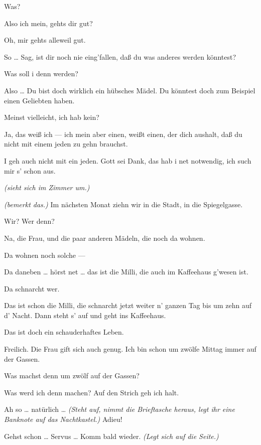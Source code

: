 \documentclass[
	final,
	a4paper,
	ngerman,
	mpinclude = true, %
	twoside = true,
	open = right,
	cleardoublepage = plain,
	DIV = 13,
	BCOR = 1cm,
	titlepage = firstiscover,
	]{scrbook}
\newcommand{\direction}[1]{\textit{(#1)}}
\newcommand{\thecharacter}[1]{\textup{\textsc{#1}}\xspace}
\newcommand{\thenutte}{\thecharacter{Leocadia}}
\newcommand{\theentrepeneurin}{\thecharacter{Katerina Albrecht}}
\newcommand{\character}[1]{\item[#1:]}
\newcommand{\nutte}{\character{\thenutte}}
\newcommand{\entrepeneurin}{\character{\theentrepeneurin}}
\begin{document}
\begin{play}
	\nutte
	Was?

	\entrepeneurin
	Also ich mein, gehts dir gut?

	\nutte
	Oh, mir gehts alleweil gut.

	\entrepeneurin
	So \ldots{} Sag, ist dir noch nie eing'fallen, daß du was anderes werden könntest?

	\nutte
	Was soll i denn werden?

	\entrepeneurin
	Also \ldots{} Du bist doch wirklich ein hübsches Mädel. Du könntest doch zum Beispiel einen Geliebten haben.

	\nutte
	Meinst vielleicht, ich hab kein?

	\entrepeneurin
	Ja, das weiß ich --- ich mein aber einen, weißt einen, der dich aushalt, daß du nicht mit einem jeden zu gehn brauchst.

	\nutte
	I geh auch nicht mit ein jeden. Gott sei Dank, das hab i net notwendig, ich such mir s' schon aus.

	\entrepeneurin
	\direction{sieht sich im Zimmer um.}

	\nutte
	\direction{bemerkt das.} Im nächsten Monat ziehn wir in die Stadt, in die Spiegelgasse.

	\entrepeneurin
	Wir? Wer denn?

	\nutte
	Na, die Frau, und die paar anderen Mädeln, die noch da wohnen.

	\entrepeneurin
	Da wohnen noch solche ---

	\nutte
	Da daneben \ldots{} hörst net \ldots{} das ist die Milli, die auch im Kaffeehaus g'wesen ist.

	\entrepeneurin
	Da schnarcht wer.

	\nutte
	Das ist schon die Milli, die schnarcht jetzt weiter n' ganzen Tag bis um zehn auf d' Nacht. Dann steht s' auf und geht ins Kaffeehaus.

	\entrepeneurin
	Das ist doch ein schauderhaftes Leben.

	\nutte
	Freilich. Die Frau gift sich auch genug. Ich bin schon um zwölfe Mittag immer auf der Gassen.

	\entrepeneurin
	Was machst denn um zwölf auf der Gassen?

	\nutte
	Was werd ich denn machen? Auf den Strich geh ich halt.

	\entrepeneurin
	Ah so \ldots{} natürlich \ldots{} \direction{Steht auf, nimmt die Brieftasche heraus, legt ihr eine Banknote auf das Nachtkastel.} Adieu!

	\nutte
	Gehst schon \ldots{} Servus \ldots{} Komm bald wieder. \direction{Legt sich auf die Seite.}


\end{play}
\end{document}
